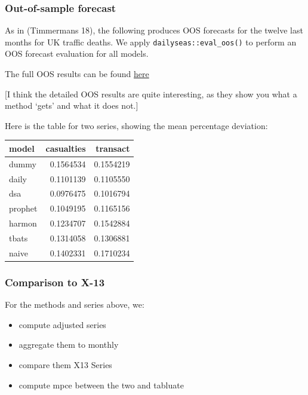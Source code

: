 \hypertarget{out-of-sample-forecast}{%
\subsubsection{Out-of-sample forecast}\label{out-of-sample-forecast}}

As in (Timmermans 18), the following produces OOS forecasts for the
twelve last months for UK traffic deaths. We apply
\texttt{dailyseas::eval\_oos()} to perform an OOS forecast evaluation
for all models.

The full OOS results can be found
\href{https://github.com/christophsax/x13book/blob/master/topics/dailyadj/vignettes/overview.md}{here}

{[}I think the detailed OOS results are quite interesting, as they show
you what a method `gets' and what it does not.{]}

Here is the table for two series, showing the mean percentage deviation:

\begin{Schunk}

\begin{tabular}{l|r|r}
\hline
model & casualties & transact\\
\hline
dummy & 0.1564534 & 0.1554219\\
\hline
daily & 0.1101139 & 0.1105550\\
\hline
dsa & 0.0976475 & 0.1016794\\
\hline
prophet & 0.1049195 & 0.1165156\\
\hline
harmon & 0.1234707 & 0.1542884\\
\hline
tbats & 0.1314058 & 0.1306881\\
\hline
naive & 0.1402331 & 0.1710234\\
\hline
\end{tabular}

\end{Schunk}

\hypertarget{comparison-to-x-13}{%
\subsubsection{Comparison to X-13}\label{comparison-to-x-13}}

For the methods and series above, we:

\begin{itemize}
\tightlist
\item
  compute adjusted series
\item
  aggregate them to monthly
\item
  compare them X13 Series
\item
  compute mpce between the two and tabluate
\end{itemize}

